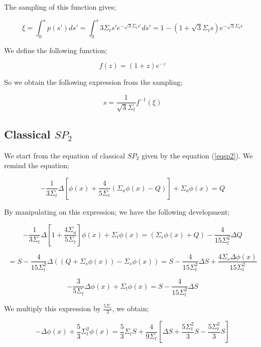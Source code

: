 \documentclass[a4paper, 12pt]{report}
\begin{document}
The sampling of this function gives;

\begin{equation}
\xi = \int_0^s p(s') ds' = \int_0^s 3\Sigma_t s' e^{-\sqrt{3}\Sigma_t s'} ds' = 1 - (1 + \sqrt{3}\Sigma_t s)e^{-\sqrt{3}\Sigma_t s}
\end{equation}

We define the following function;

\begin{equation}
f(z) = (1+z)e^{-z}
\end{equation}

So we obtain the following expression from the sampling;

\begin{equation}
s = \frac{1}{\sqrt{3}\Sigma_t}f^{-1}(\xi)
\end{equation}

\subsection{Classical $SP_2$}

We start from the equation of classical $SP_2$ given by the equation (\ref{eqsp2}). We remind the equation;

\begin{equation}
-\frac{1}{3\Sigma_t}\Delta \left[ \phi(x) + \frac{4}{5\Sigma_t}(\Sigma_a \phi(x) - Q) \right] + \Sigma_a\phi(x) = Q
\end{equation}

By manipulating on this expression; we have the following development;

$$
-\frac{1}{3\Sigma_t}\Delta \left[ 1 + \frac{4\Sigma_a}{5\Sigma_t} \right]\phi(x) + \Sigma_t\phi(x) = (\Sigma_s\phi(x) + Q) -\frac{4}{15\Sigma_t^2}\Delta Q
$$

$$
= S - \frac{4}{15\Sigma_t^2}\Delta ((Q+\Sigma_s \phi(x)) - \Sigma_s\phi(x)) = S - \frac{4}{15\Sigma_t^2}\Delta S + \frac{4\Sigma_s \Delta\phi(x)}{15\Sigma_t^2}
$$

\begin{equation}
-\frac{3}{5\Sigma_t}\Delta \phi(x) + \Sigma_t\phi(x) =  S - \frac{4}{15\Sigma_t^2}\Delta S
\end{equation}

We multiply this expression by $\frac{5\Sigma_t}{3}$, we obtain;

\begin{equation}
-\Delta \phi(x) + \frac{5}{3}\Sigma_t^2\phi(x) = \frac{5}{3}\Sigma_t S + \frac{4}{9\Sigma_t}\left[ \Delta S + \frac{5\Sigma_t^2}{3}S -\frac{5\Sigma_t^2}{3}S  \right]
\end{equation}
\end{document}
